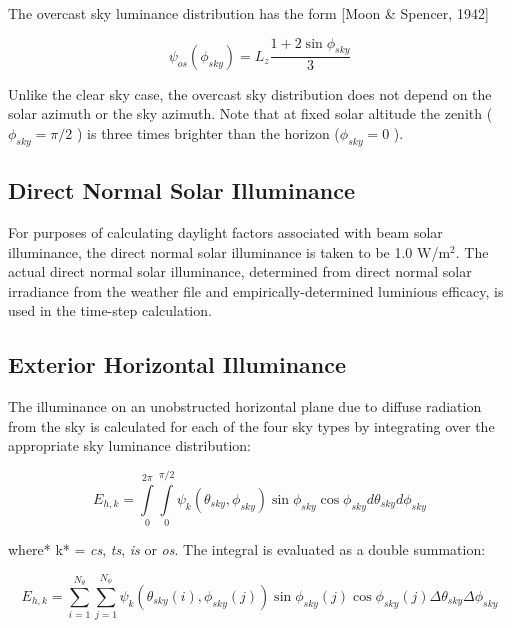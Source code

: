 The overcast sky luminance distribution has the form {[}Moon \& Spencer, 1942{]}

\begin{equation}
{\psi_{os}}({\phi_{sky}}) = {L_z}\frac{{1 + 2\sin {\phi_{sky}}}}{3}
\end{equation}

Unlike the clear sky case, the overcast sky distribution does not depend on the solar azimuth or the sky azimuth. Note that at fixed solar altitude the zenith (\({\phi_{sky}} = \pi /2\) ) is three times brighter than the horizon (\({\phi_{sky}} = 0\) ).

\subsection{Direct Normal Solar Illuminance}\label{direct-normal-solar-illuminance}

For purposes of calculating daylight factors associated with beam solar illuminance, the direct normal solar illuminance is taken to be 1.0 W/m\(^{2}\). The actual direct normal solar illuminance, determined from direct normal solar irradiance from the weather file and empirically-determined luminious efficacy, is used in the time-step calculation.

\subsection{Exterior Horizontal Illuminance}\label{exterior-horizontal-illuminance}

The illuminance on an unobstructed horizontal plane due to diffuse radiation from the sky is calculated for each of the four sky types by integrating over the appropriate sky luminance distribution:

\begin{equation}
{E_{h,k}} = \int\limits_0^{2\pi } {\int\limits_0^{\pi /2} {{\psi_k}({\theta_{sky}},{\phi_{sky}})\sin {\phi_{sky}}\cos {\phi_{sky}}d{\theta_{sky}}} } d{\phi_{sky}}
\end{equation}

where* k* = \emph{cs}, \emph{ts}, \emph{is} or \emph{os}. The integral is evaluated as a double summation:

\begin{equation}
{E_{h,k}} = \sum\limits_{i = 1}^{{N_\theta }} {\sum\limits_{j = 1}^{{N_\phi }} {{\psi_k}\left( {{\theta_{sky}}(i),{\phi_{sky}}(j)} \right)} } \sin {\phi_{sky}}(j)\cos {\phi_{sky}}(j)\Delta {\theta_{sky}}\Delta {\phi_{sky}}
\end{equation}

